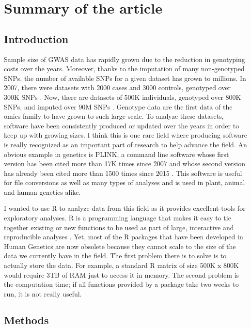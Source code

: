 \section{Summary of the article}

\subsection{Introduction}

Sample size of GWAS data has rapidly grown due to the reduction in genotyping costs over the years. Moreover, thanks to the imputation of many non-genotyped SNPs, the number of available SNPs for a given dataset has grown to millions. In 2007, there were datasets with 2000 cases and 3000 controls, genotyped over 300K SNPs \cite[]{wellcome2007genome}. Now, there are datasets of 500K individuals, genotyped over 800K SNPs, and imputed over 90M SNPs \cite[]{bycroft2017genome}.
Genotype data are the first data of the omics family to have grown to such large scale. To analyze these datasets, software have been consistently produced or updated over the years in order to keep up with growing sizes. 
I think this is one rare field where producing software is really recognized as an important part of research to help advance the field.
An obvious example in genetics is PLINK, a command line software whose first version has been cited more than 17K times since 2007 and whose second version has already been cited more than 1500 times since 2015 \cite[]{purcell2007plink,chang2015second}. This software is useful for file conversions as well as many types of analyses and is used in plant, animal and human genetics alike.

I wanted to use R to analyze data from this field as it provides excellent tools for exploratory analyses. 
R is a programming language that makes it easy to tie together existing or
new functions to be used as part of large, interactive and reproducible
analyses \cite[]{R2018}.
Yet, most of the R packages that have been developed in Human Genetics are now obsolete because they cannot scale to the size of the data we currently have in the field.
The first problem there is to solve is to actually store the data. For example, a standard R matrix of size 500K x 800K would require 3TB of RAM just to access it in memory.
The second problem is the computation time; if all functions provided by a package take two weeks to run, it is not really useful.

\subsection{Methods}

